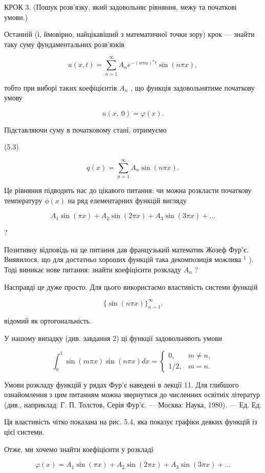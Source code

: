 \documentclass[
  ukrainian,
]{article}
\begin{document}
КРОК 3. (Пошук розв'язку, який задовольняє рівняння, межу та початкові
умови.)

Останній (і, ймовірно, найцікавіший з математичної точки зору) крок ---
знайти таку суму фундаментальних розв'язків

\[u(x, t) = \sum_{n=1}^{\infty} A_n e^{-(n\pi\alpha)^n t} \sin(n\pi x),\]

тобто при виборі таких коефіцієнтів \(A_n\) , що функція задовольнятиме
початкову умову

\[u\left( x,\ 0\right) =\varphi\left( x\right) .\]

Підставляючи суму в початковому стані, отримуємо

(5.3)

\[q(x) = \sum_{n=1}^{\infty} A_n \sin(n\pi x).\]

Це рівняння підводить нас до цікавого питання: чи можна розкласти
початкову температуру \(\phi(x)\) на ряд елементарних функцій вигляду

\[A_1 \sin(\pi x) + A_2 \sin(2\pi x) + A_3 \sin(3\pi x) + \dots\]

?

Позитивну відповідь на це питання дав французький математик Жозеф Фур'є.
Виявилося, що для достатньо хороших функцій така декомпозиція можлива
\(^1\) ). Тоді виникає нове питання: знайти коефіцієнти розкладу \(A_n\)
?

Насправді це дуже просто. Для цього використаємо властивість системи
функцій

\[\{\sin(n\pi x)\}_{n=1}^{\infty}.\]

відомий як ортогональність.

У нашому випадку (див. завдання 2) ці функції задовольняють умови

\[\int_{0}^{1} \sin(m\pi x) \sin(n\pi x) dx = \begin{cases} 0, & m \neq n, \\ 1/2, & m = n. \end{cases}\]

Умови розкладу функцій у рядах Фур'є наведені в лекції 11. Для глибшого
ознайомлення з цим питанням можна звернутися до численних освітніх
літератур (див., наприклад: Г. П. Толстов, Серія Фур'є. --- Москва:
Наука, 1980). --- Ед. Ед.

Ця властивість чітко показана на рис. 5.4, яка показує графіки деяких
функцій із цієї системи.

Отже, ми хочемо знайти коефіцієнти у розкладі

\[\varphi(x) = A_1 \sin(\pi x) + A_2 \sin(2\pi x) + A_3 \sin(3\pi x) + \dots\]
\end{document}
